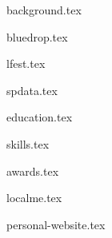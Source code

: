 \documentclass[11pt]{article}
\begin{document}
{background.tex}


{bluedrop.tex}

{lfest.tex}

{spdata.tex}


{education.tex}


{skills.tex}


{awards.tex}


{localme.tex}

{personal-website.tex}
\end{document}
